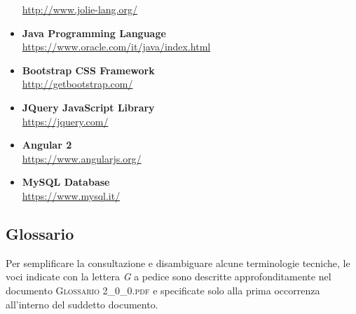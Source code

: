 \begin{itemize}
	\url{http://www.jolie-lang.org/}
	\item \textbf{Java Programming Language}\\
	\url{https://www.oracle.com/it/java/index.html}
	\item \textbf{Bootstrap CSS Framework}\\
	\url{http://getbootstrap.com/}
	\item \textbf{JQuery JavaScript Library}\\
	\url{https://jquery.com/}
	\item \textbf{Angular 2}\\
	\url{https://www.angularjs.org/}
	\item \textbf{MySQL Database}\\
	\url{https://www.mysql.it/}
\end{itemize}

\subsection{Glossario}
Per semplificare la consultazione e disambiguare alcune terminologie tecniche, le voci indicate con la lettera \textit{G} a pedice sono descritte approfonditamente nel documento \textsc{Glossario 2\_0\_0.pdf} e specificate solo alla prima occorrenza all'interno del suddetto documento.